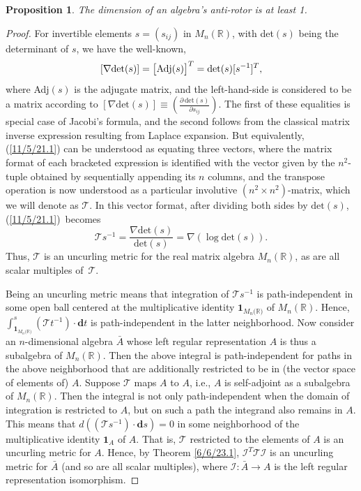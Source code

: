 \documentclass{amsart}
\newtheorem{proposition}[theorem]{Proposition}
\theoremstyle{definition}
\numberwithin{theorem}{section}
\numberwithin{equation}{section}
\begin{document}
\begin{proposition}\label{6/11/25.1} The dimension of an algebra's anti-rotor is at least 1. \end{proposition} 
\begin{proof} For invertible elements $s = (s_{ij})$ in $M_n(\mathbb{R})$, with det$(s)$ being the determinant of $s$, we have the well-known,
  \begin{equation}\label{11/5/21.1}[\nabla \text{det}(s)] = \big[{\rm Adj}(s)\big]^T = \mbox{det}(s)[s^{-1}]^T,\end{equation} where Adj$(s)$ is the adjugate matrix, and the left-hand-side is considered to be a matrix according to $[\nabla \text{det}(s)]\equiv \left(\frac{\partial\,\text{det}(s)}{\partial s_{ij}}\right)$. The first of these equalities is special case of Jacobi's formula, and the second follows from the classical matrix inverse expression resulting from Laplace expansion. 
    But equivalently, (\ref{11/5/21.1}) can be understood as equating three vectors, where the matrix format of each bracketed expression is identified with the vector given by the \mbox{$n^2$-tuple} obtained by sequentially appending its $n$ columns, and the transpose operation is now understood as a particular involutive $(n^2\times n^2)$-matrix, which we will denote as $\mathcal{T}$.  In this vector format, after dividing both sides by $\text{det}(s)$, \mbox{(\ref{11/5/21.1}) becomes} \begin{equation}\label{6/11/25.2}\mathcal{T}s^{-1} = \frac{\nabla\text{det}(s)}{\text{det}(s)} = \nabla\left(\log \text{det}(s)\right).\end{equation}  Thus,  $\mathcal{T}$ is an uncurling metric for the real matrix algebra $M_n(\mathbb{R})$, as are all scalar multiples \mbox{of $\mathcal{T}$}. 

Being an uncurling metric means that integration of $\mathcal{T}s^{-1}$ is path-independent in some open ball centered at the multiplicative identity $\mathbf{1}_{M_n({\mathbb{R})}}$ of $M_n(\mathbb{R})$.  
 Hence, \mbox{$\int_{\mathbf{1}_{M_n({\mathbb{R})}}}^s (\mathcal{\mathcal{T}}t^{-1})\cdot \mathbf{d}t$} is path-independent in the latter neighborhood.  Now consider an $n$-dimensional algebra $\bar{A}$ whose left regular representation $A$ is thus a subalgebra of $M_n(\mathbb{R})$.  Then the above integral is path-independent for paths in the above neighborhood that are additionally restricted to be in (the vector space of elements of) $A$.  Suppose $\mathcal{T}$ maps $A$ to $A$, i.e., $A$ is self-adjoint as a subalgebra of $M_n(\mathbb{R})$. 
 Then the integral is not only path-independent when the domain of integration is restricted to $A$, but on such a path the integrand also remains in $A$.  This means that 
  $d((\mathcal{T}s^{-1})\cdot \mathbf{d}s) = 0$ in some neighborhood of the multiplicative identity $\mathbf{1}_A$ of $A$.  That is,  $\mathcal{T}$ restricted to the elements of $A$ is an uncurling metric for $A$.  Hence, by Theorem \ref{6/6/23.1}, $\mathcal{I}^T\mathcal{T}\mathcal{I}$ is an uncurling metric for $\bar{A}$ (and so are all scalar multiples), where $\mathcal{I}:\bar{A}\rightarrow A$ is the left regular representation isomorphism.  
  

\end{proof}
\end{document}
